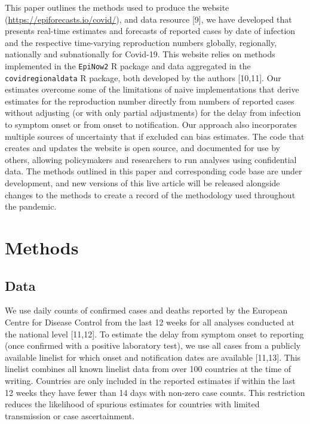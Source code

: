 \documentclass[
]{article}
\begin{document}
This paper outlines the methods used to produce the website
(\url{https://epiforecasts.io/covid/}), and data resource {[}9{]}, we
have developed that presents real-time estimates and forecasts of
reported cases by date of infection and the respective time-varying
reproduction numbers globally, regionally, nationally and subnationally
for Covid-19. This website relies on methods implemented in the
\texttt{EpiNow2} R package and data aggregated in the
\texttt{covidregionaldata} R package, both developed by the authors
{[}10,11{]}. Our estimates overcome some of the limitations of naive
implementations that derive estimates for the reproduction number
directly from numbers of reported cases without adjusting (or with only
partial adjustments) for the delay from infection to symptom onset or
from onset to notification. Our approach also incorporates multiple
sources of uncertainty that if excluded can bias estimates. The code
that creates and updates the website is open source, and documented for
use by others, allowing policymakers and researchers to run analyses
using confidential data. The methods outlined in this paper and
corresponding code base are under development, and new versions of this
live article will be released alongside changes to the methods to create
a record of the methodology used throughout the pandemic.

\hypertarget{methods}{%
\section{Methods}\label{methods}}

\hypertarget{data}{%
\subsection{Data}\label{data}}

We use daily counts of confirmed cases and deaths reported by the
European Centre for Disease Control from the last 12 weeks for all
analyses conducted at the national level {[}11,12{]}. To estimate the
delay from symptom onset to reporting (once confirmed with a positive
laboratory test), we use all cases from a publicly available linelist
for which onset and notification dates are available {[}11,13{]}. This
linelist combines all known linelist data from over 100 countries at the
time of writing. Countries are only included in the reported estimates
if within the last 12 weeks they have fewer than 14 days with non-zero
case counts. This restriction reduces the likelihood of spurious
estimates for countries with limited transmission or case ascertainment.
\end{document}

